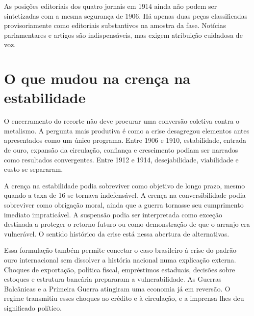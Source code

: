 As posições editoriais dos quatro jornais em 1914 ainda não podem ser sintetizadas com a mesma segurança de 1906. Há apenas duas peças classificadas provisoriamente como editoriais substantivos na amostra da fase. Notícias parlamentares e artigos são indispensáveis, mas exigem atribuição cuidadosa de voz.


\section{O que mudou na crença na estabilidade}

O encerramento do recorte não deve procurar uma conversão coletiva contra o metalismo. A pergunta mais produtiva é como a crise desagregou elementos antes apresentados como um único programa. Entre 1906 e 1910, estabilidade, entrada de ouro, expansão da circulação, confiança e crescimento podiam ser narrados como resultados convergentes. Entre 1912 e 1914, desejabilidade, viabilidade e custo se separaram.

A crença na estabilidade podia sobreviver como objetivo de longo prazo, mesmo quando a taxa de 16 se tornava indefensável. A crença na conversibilidade podia sobreviver como obrigação moral, ainda que a guerra tornasse seu cumprimento imediato impraticável. A suspensão podia ser interpretada como exceção destinada a proteger o retorno futuro ou como demonstração de que o arranjo era vulnerável. O sentido histórico da crise está nessa abertura de alternativas.


Essa formulação também permite conectar o caso brasileiro à crise do padrão-ouro internacional sem dissolver a história nacional numa explicação externa. Choques de exportação, política fiscal, empréstimos estaduais, decisões sobre estoques e estrutura bancária prepararam a vulnerabilidade. As Guerras Balcânicas e a Primeira Guerra atingiram uma economia já em reversão. O regime transmitiu esses choques ao crédito e à circulação, e a imprensa lhes deu significado político.
